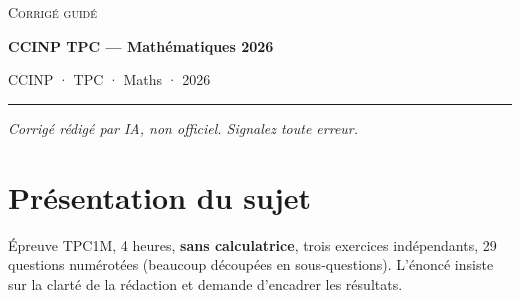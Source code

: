 \documentclass[11pt,a4paper]{article}
\begin{document}
\thispagestyle{plain}
\begin{center}
  {\small\scshape Corrigé guidé}\par\smallskip
  {\LARGE\bfseries CCINP TPC — Mathématiques 2026\par}\medskip
  {\large CCINP · TPC · Maths · 2026\par}
\end{center}
\vspace{2pt}\hrule\vspace{8pt}

\emph{Corrigé rédigé par IA, non officiel. Signalez toute erreur.}

\hypertarget{pruxe9sentation-du-sujet}{%
\section{Présentation du sujet}\label{pruxe9sentation-du-sujet}}

Épreuve TPC1M, 4 heures, \textbf{sans calculatrice}, trois exercices indépendants, 29 questions numérotées (beaucoup découpées en sous-questions). L'énoncé insiste sur la clarté de la rédaction et demande d'encadrer les résultats.
\end{document}
